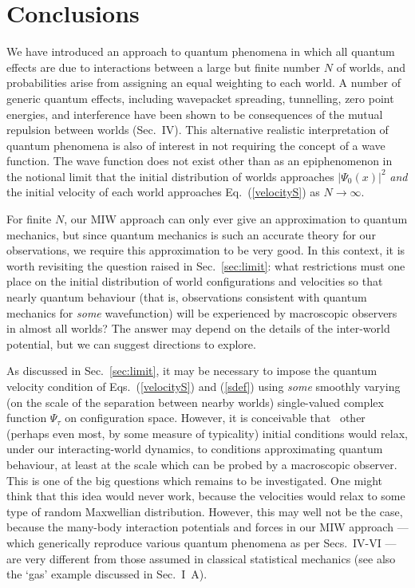 \documentclass[12pt, aps,pra,amsmath,amssymb,superscriptaddress]{revtex4-2}
\renewcommand{\(}{\left(}
\renewcommand{\)}{\right)}
\newcommand{\red}{\color{red}}
\newcommand{\blk}{\color{black}}
\newcommand{\blu}{\color{blue}}
\renewcommand\blu{\blk}
\renewcommand\red{\blk}
\begin{document}
\section{Conclusions}

We have introduced an approach to quantum phenomena in which all quantum effects
are due to interactions between a large but finite number $N$ \blk of worlds, and
probabilities arise from assigning an equal weighting to each world.  A number
of generic quantum effects, including  wavepacket  spreading,  
tunnelling, zero
point energies, and interference \blk have been shown to be consequences of the mutual repulsion
between worlds   \blk (Sec.~IV).  This
alternative realistic interpretation of quantum phenomena is also of interest in
not requiring the concept of a wave function. 
The \blk wave function does not
exist other than as an epiphenomenon  in the notional limit 
that the initial distribution of worlds approaches $|\Psi_0(x)|^2$ 
{\it and} the initial velocity of each world approaches Eq.~(\ref{velocityS}) as $N\to\infty$.

 For finite $N$, our MIW approach can only ever give an approximation to 
quantum mechanics, but since quantum mechanics
is such an accurate theory for our observations, we require this approximation to 
be very good. \red In this context, it is worth   revisiting the question 
raised in Sec.~\ref{sec:limit}: \blk 
what restrictions must one place on the initial distribution of world configurations 
and velocities so that nearly quantum behaviour (that is, observations consistent with 
quantum mechanics for {\em some} wavefunction) 
will  be experienced by macroscopic observers in almost all worlds?    
The answer may depend on the details of the inter-world potential, 
\red but we can suggest directions to explore.

\red As discussed in Sec.~\ref{sec:limit}, it \blk may be necessary 
to impose the quantum velocity condition of Eqs.~(\ref{velocityS}) and (\ref{sdef}) \blk using {\em some} smoothly 
varying (on the scale of the separation between nearby worlds) 
single-valued complex function \red $\Psi_\tau$ \blk on configuration space.
\red However, \blk it is conceivable that \ other (perhaps even most, by some measure 
of typicality)  initial conditions would relax, under our 
interacting-world dynamics, to conditions approximating quantum behaviour, 
at least at the scale which can be probed by a macroscopic observer. 
This is one of the big questions which remains to be investigated. \red One might 
think that this idea would never work, because the velocities 
would relax to \blu some type of random Maxwellian distribution. \red 
 However, this may well not be the case, because \blu 
 the many-body interaction potentials and forces in our MIW approach 
--- which generically reproduce various quantum phenomena as per Secs.~IV-VI \red --- are very 
different from those assumed in classical statistical mechanics \blu (see also the `gas' example discussed in Sec.~I~A).   \blk
\end{document}
